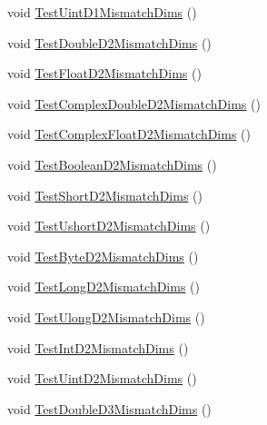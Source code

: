 \begin{DoxyCompactItemize}
\item 
void \mbox{\hyperlink{classkhiva_1_1array_1_1tests_1_1_array_tests_a81af7c62b6da78784db2ac656a755099}{Test\+Uint\+D1\+Mismatch\+Dims}} ()
\item 
void \mbox{\hyperlink{classkhiva_1_1array_1_1tests_1_1_array_tests_a7e8676e30e18073f8066ac45da975dd8}{Test\+Double\+D2\+Mismatch\+Dims}} ()
\item 
void \mbox{\hyperlink{classkhiva_1_1array_1_1tests_1_1_array_tests_a59325a294bbf5522326f6216ebaca21b}{Test\+Float\+D2\+Mismatch\+Dims}} ()
\item 
void \mbox{\hyperlink{classkhiva_1_1array_1_1tests_1_1_array_tests_a63f4e85ef98716f3b98861bf99d327bd}{Test\+Complex\+Double\+D2\+Mismatch\+Dims}} ()
\item 
void \mbox{\hyperlink{classkhiva_1_1array_1_1tests_1_1_array_tests_a090208d340d0dccec74f775425f1a9d5}{Test\+Complex\+Float\+D2\+Mismatch\+Dims}} ()
\item 
void \mbox{\hyperlink{classkhiva_1_1array_1_1tests_1_1_array_tests_afbad8d53a7198e92ac97033415d6334e}{Test\+Boolean\+D2\+Mismatch\+Dims}} ()
\item 
void \mbox{\hyperlink{classkhiva_1_1array_1_1tests_1_1_array_tests_a2de92215a5aad48b471354abf7d2c904}{Test\+Short\+D2\+Mismatch\+Dims}} ()
\item 
void \mbox{\hyperlink{classkhiva_1_1array_1_1tests_1_1_array_tests_a42f006f8f944be370175a053c94ad67c}{Test\+Ushort\+D2\+Mismatch\+Dims}} ()
\item 
void \mbox{\hyperlink{classkhiva_1_1array_1_1tests_1_1_array_tests_a61e1210a7a491c10aa06f1a7f1dfa9b4}{Test\+Byte\+D2\+Mismatch\+Dims}} ()
\item 
void \mbox{\hyperlink{classkhiva_1_1array_1_1tests_1_1_array_tests_a1bf8ac66257f9191d82142b95ba06e12}{Test\+Long\+D2\+Mismatch\+Dims}} ()
\item 
void \mbox{\hyperlink{classkhiva_1_1array_1_1tests_1_1_array_tests_afd6895dfa0031937e4c6b1fbbdd08ec2}{Test\+Ulong\+D2\+Mismatch\+Dims}} ()
\item 
void \mbox{\hyperlink{classkhiva_1_1array_1_1tests_1_1_array_tests_a9d966bfde5ad2092403f74e183ce3203}{Test\+Int\+D2\+Mismatch\+Dims}} ()
\item 
void \mbox{\hyperlink{classkhiva_1_1array_1_1tests_1_1_array_tests_a496d484f4bc2629837251fee001e5144}{Test\+Uint\+D2\+Mismatch\+Dims}} ()
\item 
void \mbox{\hyperlink{classkhiva_1_1array_1_1tests_1_1_array_tests_a2d51d546f4d7c98dec2f2bd95931b922}{Test\+Double\+D3\+Mismatch\+Dims}} ()

\end{DoxyCompactItemize}
